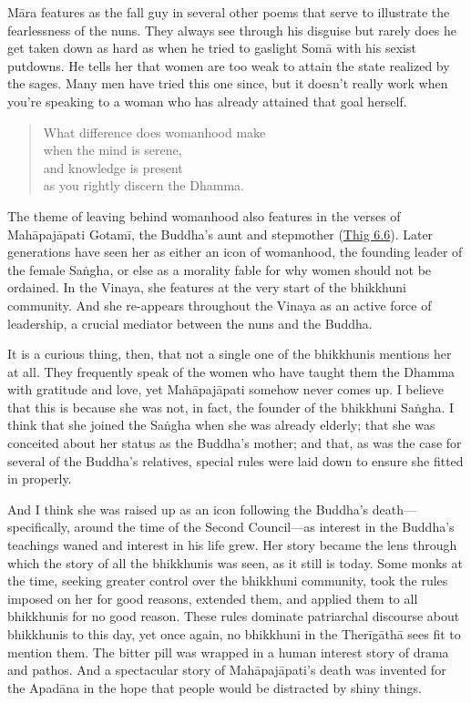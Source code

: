 \documentclass[12pt,openany]{book}%
\begin{document}
\textsanskrit{Māra} features as the fall guy in several other poems that serve to illustrate the fearlessness of the nuns. They always see through his disguise but rarely does he get taken down as hard as when he tried to gaslight \textsanskrit{Somā} with his sexist putdowns. He tells her that women are too weak to attain the state realized by the sages. Many men have tried this one since, but it doesn’t really work when you’re speaking to a woman who has already attained that goal herself.

\begin{verse}%
What difference does womanhood make \\
when the mind is serene, \\
and knowledge is present \\
as you rightly discern the Dhamma.

%
\end{verse}

The theme of leaving behind womanhood also features in the verses of \textsanskrit{Mahāpajāpati} \textsanskrit{Gotamī}, the Buddha’s aunt and stepmother (\href{https://suttacentral.net/thig6.6}{Thig 6.6}). Later generations have seen her as either an icon of womanhood, the founding leader of the female \textsanskrit{Saṅgha}, or else as a morality fable for why women should not be ordained. In the Vinaya, she features at the very start of the bhikkhuni community. And she re-appears throughout the Vinaya as an active force of leadership, a crucial mediator between the nuns and the Buddha.

It is a curious thing, then, that not a single one of the bhikkhunis mentions her at all. They frequently speak of the women who have taught them the Dhamma with gratitude and love, yet \textsanskrit{Mahāpajāpati} somehow never comes up. I believe that this is because she was not, in fact, the founder of the bhikkhuni \textsanskrit{Saṅgha}. I think that she joined the \textsanskrit{Saṅgha} when she was already elderly; that she was conceited about her status as the Buddha’s mother; and that, as was the case for several of the Buddha’s relatives, special rules were laid down to ensure she fitted in properly.

And I think she was raised up as an icon following the Buddha’s death—specifically, around the time of the Second Council—as interest in the Buddha’s teachings waned and interest in his life grew. Her story became the lens through which the story of all the bhikkhunis was seen, as it still is today. Some monks at the time, seeking greater control over the bhikkhuni community, took the rules imposed on her for good reasons, extended them, and applied them to all bhikkhunis for no good reason. These rules dominate patriarchal discourse about bhikkhunis to this day, yet once again, no bhikkhuni in the \textsanskrit{Therīgāthā} sees fit to mention them. The bitter pill was wrapped in a human interest story of drama and pathos. And a spectacular story of \textsanskrit{Mahāpajāpati}’s death was invented for the \textsanskrit{Apadāna} in the hope that people would be distracted by shiny things.
\end{document}
